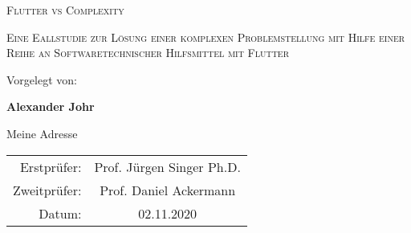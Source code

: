 
\begin{center}
    


    \vspace{20mm}

    \Huge
    \textsc{Flutter vs Complexity}

    \vspace{5mm}

    \Large
    \textsc{Eine Eallstudie zur Lösung einer komplexen Problemstellung mit Hilfe einer Reihe an Softwaretechnischer Hilfsmittel mit Flutter}
    \vfill
    

    \normalsize
    Vorgelegt von:

    \textbf{Alexander Johr}

    Meine Adresse

    \vspace{20mm}

    \begin{tabular}{r c}
        Erstprüfer: & Prof. Jürgen Singer Ph.D. \\
        Zweitprüfer: & Prof. Daniel Ackermann \\
        Datum: & 02.11.2020 \\
    \end{tabular}

    \vspace{5mm}

\end{center}


